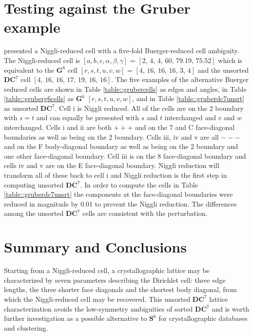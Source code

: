 \documentclass[preprint]{iucr}              %
\begin{document}
{\section{Testing against the Gruber example}

 presented a Niggli-reduced cell with a five-fold
Buerger-reduced cell ambiguity.  The Niggli-reduced cell is
$[a, b, c, \alpha ,\beta ,\gamma ]$ 
= $ [2,\,4,\,4,\,60,\,79.19,\,75.52] $
which is equivalent to the $\mathbf{G}^6$ cell 
$ [r,s,t,u,v,w]$ = $ [4,\, 16,\, 16,\, 16,\, 3,\, 4 ] $
and the unsorted $\mathbf{DC}^7$ cell $[4,\, 16,\, 16,\, 17,\, 19,\, 16,\, 16 ]$.  The five examples of the alternative
Buerger reduced cells are shown in Table \ref{table::grubercells} as edges and angles, in Table \ref{table::gruberg6cells} as $\mathbf{G}^6$ $[r,s,t,u,v,w]$, and in
Table \ref{table::gruberdc7unsrt} as unsorted $\mathbf{DC}^7$.
Cell i is Niggli reduced.   All of the cells are on the 2 boundary
with $s=t$ and can equally be presented with $s$ and $t$ interchanged and $v$ and $w$ interchanged.  Cells i and ii
are both $+++$ and on the 7 and C face-diagonal boundaries as well as being on the 2 boundary.  Cells iii, iv and v are all $---$ and on the F body-diagonal boundary as well as being on the
2 boundary and one other face-diagonal boundary.
Cell iii is on the 8 face-diagonal boundary and cells iv and v
are on the E face-diagonal boundary.  Niggli reduction will
transform all of these back to cell i and Niggli reduction is
the first step in computing unsorted $\mathbf{DC}^7$. 
In order to compute the cells in Table \ref{table::gruberdc7unsrt} the components at the face-diagonal
boundaries were reduced in magnitude by 0.01 to prevent the
Niggli reduction.  The differences among the unsorted $\mathbf{DC}^7$ cells are consistent with the perturbation.

\section{Summary and Conclusions}

Starting from a Niggli-reduced cell, a crystallographic lattice may be characterized by seven parameters describing the Dirichlet cell: three edge lengths, the three shorter face diagonals and the shortest body diagonal,
from which the Niggli-reduced cell may be recovered.  This
unsorted $\mathbf{DC}^7$ lattice characterization avoids
the low-symmetry ambiguities of sorted $\mathbf{DC}^7$ and
is worth further investigation as a possible alternative to
$\mathbf{S}^6$ for crystallographic databases and clustering.


}
\end{document}

